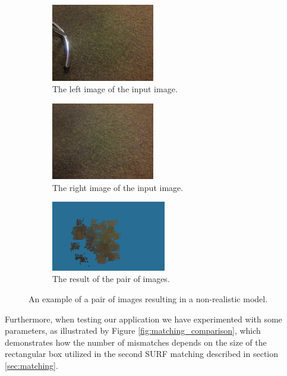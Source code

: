 \begin{figure}[h]
\centering

\begin{subfigure}[b]{0.45\textwidth}
\centering
\includegraphics[width=4.5cm]{img/bad_input1.png}
\caption{The left image of the input image.} \label{x0}
\end{subfigure}
\begin{subfigure}[b]{0.45\textwidth}
\centering
\includegraphics[width=4.5cm]{img/bad_input2}
\caption{The right image of the input image.} \label{x2}
\end{subfigure}
\begin{subfigure}[b]{0.45\textwidth}
\centering
\includegraphics[width=5.0cm]{img/bad_result.png}
\caption{The result of the pair of images.} \label{x3}
\end{subfigure}
\caption[]{An example of a pair of images resulting in a non-realistic model.} 
\label{fig:bad_example}
\end{figure}
Furthermore, when testing our application we have experimented with some parameters, as illustrated by Figure \ref{fig:matching_comparison}, which demonstrates how the number of mismatches depends on the size of the rectangular box utilized in the second SURF matching described in section \ref{sec:matching}.
